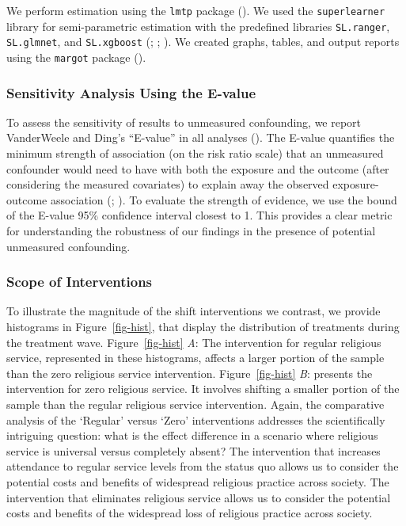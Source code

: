 \documentclass[
  single column]{article}
\begin{document}
We perform estimation using the \texttt{lmtp} package
(). We used the
\texttt{superlearner} library for semi-parametric estimation with the
predefined libraries \texttt{SL.ranger}, \texttt{SL.glmnet}, and
\texttt{SL.xgboost} (; ;
). We created graphs,
tables, and output reports using the \texttt{margot} package
().

\subsubsection{Sensitivity Analysis Using the
E-value}\label{sensitivity-analysis-using-the-e-value}

To assess the sensitivity of results to unmeasured confounding, we
report VanderWeele and Ding's ``E-value'' in all analyses
(). The E-value
quantifies the minimum strength of association (on the risk ratio scale)
that an unmeasured confounder would need to have with both the exposure
and the outcome (after considering the measured covariates) to explain
away the observed exposure-outcome association
(;
). To
evaluate the strength of evidence, we use the bound of the E-value 95\%
confidence interval closest to 1. This provides a clear metric for
understanding the robustness of our findings in the presence of
potential unmeasured confounding.

\subsubsection{Scope of Interventions}\label{scope-of-interventions}

To illustrate the magnitude of the shift interventions we contrast, we
provide histograms in Figure~\ref{fig-hist}, that display the
distribution of treatments during the treatment wave.
Figure~\ref{fig-hist} \emph{A}: The intervention for regular religious
service, represented in these histograms, affects a larger portion of
the sample than the zero religious service intervention.
Figure~\ref{fig-hist} \emph{B}: presents the intervention for zero
religious service. It involves shifting a smaller portion of the sample
than the regular religious service intervention. Again, the comparative
analysis of the `Regular' versus `Zero' interventions addresses the
scientifically intriguing question: what is the effect difference in a
scenario where religious service is universal versus completely absent?
The intervention that increases attendance to regular service levels
from the status quo allows us to consider the potential costs and
benefits of widespread religious practice across society. The
intervention that eliminates religious service allows us to consider the
potential costs and benefits of the widespread loss of religious
practice across society.
\end{document}
